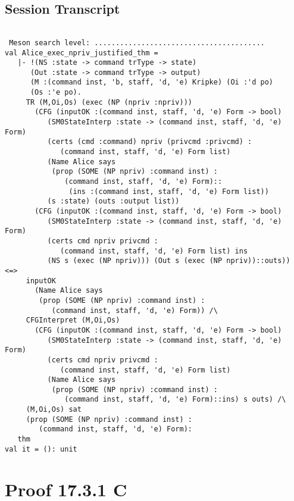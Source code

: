 \documentclass{report}
\begin{document}
\subsection{Session Transcript}
\label{trans2}
\begin{session}
  \begin{scriptsize}
\begin{verbatim}

 Meson search level: ........................................
val Alice_exec_npriv_justified_thm =
   |- !(NS :state -> command trType -> state)
      (Out :state -> command trType -> output)
      (M :(command inst, 'b, staff, 'd, 'e) Kripke) (Oi :'d po)
      (Os :'e po).
     TR (M,Oi,Os) (exec (NP (npriv :npriv)))
       (CFG (inputOK :(command inst, staff, 'd, 'e) Form -> bool)
          (SM0StateInterp :state -> (command inst, staff, 'd, 'e) Form)
          (certs (cmd :command) npriv (privcmd :privcmd) :
             (command inst, staff, 'd, 'e) Form list)
          (Name Alice says
           (prop (SOME (NP npriv) :command inst) :
              (command inst, staff, 'd, 'e) Form)::
               (ins :(command inst, staff, 'd, 'e) Form list))
          (s :state) (outs :output list))
       (CFG (inputOK :(command inst, staff, 'd, 'e) Form -> bool)
          (SM0StateInterp :state -> (command inst, staff, 'd, 'e) Form)
          (certs cmd npriv privcmd :
             (command inst, staff, 'd, 'e) Form list) ins
          (NS s (exec (NP npriv))) (Out s (exec (NP npriv))::outs)) <=>
     inputOK
       (Name Alice says
        (prop (SOME (NP npriv) :command inst) :
           (command inst, staff, 'd, 'e) Form)) /\
     CFGInterpret (M,Oi,Os)
       (CFG (inputOK :(command inst, staff, 'd, 'e) Form -> bool)
          (SM0StateInterp :state -> (command inst, staff, 'd, 'e) Form)
          (certs cmd npriv privcmd :
             (command inst, staff, 'd, 'e) Form list)
          (Name Alice says
           (prop (SOME (NP npriv) :command inst) :
              (command inst, staff, 'd, 'e) Form)::ins) s outs) /\
     (M,Oi,Os) sat
     (prop (SOME (NP npriv) :command inst) :
        (command inst, staff, 'd, 'e) Form):
   thm
val it = (): unit

\end{verbatim}
  \end{scriptsize}
\end{session}

\section{Proof 17.3.1 C}
\label{proof-3}
\end{document}
